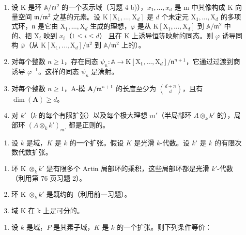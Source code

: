 \begin{enumerate}
\def\labelenumi{\alph{enumi})}
\item
  设 K 是环 \(\mathbb{A}/\mathfrak{m}^2\) 的一个表示域（习题 4 b)），\(x_1, \ldots, x_d\) 是 m 中其像构成 K-向量空间 \(\mathfrak{m}/\mathfrak{m}^2\) 之基的元素。设 \(\mathrm{K}[\mathrm{X}_1, \ldots, \mathrm{X}_d]\) 是 \(d\) 个未定元 \(\mathrm{X}_1, \ldots, \mathrm{X}_d\) 的多项式环，\(\mathfrak{n}\) 是它由 \(\mathrm{X}_1, \ldots, \mathrm{X}_d\) 生成的理想，\(\varphi\) 是从 \(\mathrm{K}[\mathrm{X}_1, \ldots, \mathrm{X}_d]\) 到 \(\mathbb{A}/\mathfrak{m}^2\) 中的、把 \(\mathrm{X}_i\) 映到 \(x_i\)（\(1 \leqslant i \leqslant d\)） 且在 K 上诱导恒等映射的同态。则 \(\varphi\) 诱导同构 \(\overline{\varphi}\)（从 \(\mathrm{K}[\mathrm{X}_1, \ldots, \mathrm{X}_d]/\mathfrak{n}^2\) 到 \(\mathbb{A}/\mathfrak{m}^2\) 上的）。
\item
  对每个整数 \(n \geqslant 1\)，存在同态 \(\psi_n: \mathbb{A} \to \mathrm{K}[\mathrm{X}_1, \ldots, \mathrm{X}_d]/\mathfrak{n}^{n+1}\)，它通过过渡到商诱导 \(\overline{\varphi}^{-1}\)。这样的同态 \(\psi_n\) 是满射。
\item
  对每个整数 \(n \geqslant 1\)，A-模 \(\mathbf{A} / \mathfrak{m}^{n+1}\) 的长度至少为 \(\binom{d+n}{d}\)，且有 \(\dim(\mathbf{A}) \geqslant d\)。
\item
  对 \(k'\)（\(k\) 的每个有限扩张）以及每个极大理想 \(m'\)（半局部环 \(A \otimes_k k'\) 的），局部环 \((A \otimes_k k')_{m'}\) 都是正则的。
\end{enumerate}

\begin{enumerate}
\def\labelenumi{\arabic{enumi})}
\setcounter{enumi}{5}
\tightlist
\item
  设 \(k\) 是域，\(K\) 是 \(k\) 的一个扩张。假设 \(K\) 是光滑 \(k\)-代数。设 \(k'\) 是 \(k\) 的有限次数代数扩张。
\end{enumerate}

\begin{enumerate}
\def\labelenumi{\alph{enumi})}
\item
  环 K \(\otimes_{k} k'\) 是有限多个 Artin 局部环的乘积，这些局部环都是光滑 \(k'\)-代数（利用第 76 页习题 2）。
\item
  环 K \(\otimes_{k} k'\) 是既约的（利用前一习题）。
\item
  域 K 在 k 上是可分的。
\end{enumerate}

\begin{enumerate}
\def\labelenumi{\arabic{enumi})}
\setcounter{enumi}{6}
\tightlist
\item
  设 \(k\) 是域，\(P\) 是其素子域，\(K\) 是 \(k\) 的一个扩张。则下列条件等价：
\end{enumerate}

